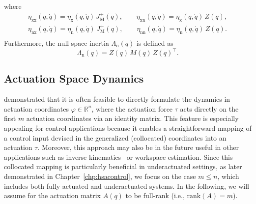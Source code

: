 where
\begin{equation}
\begin{split}
    \eta_\mathrm{xx}(q,\dot{q}) = \eta_\mathrm{x}(q,\dot{q}) \, J_\mathrm{M}^{+}(q),
    \qquad
    \eta_\mathrm{xn}(q,\dot{q}) = \eta_\mathrm{x}(q,\dot{q}) \, Z(q),\\
    \eta_\mathrm{nx}(q,\dot{q}) = \eta_\mathrm{n}(q,\dot{q}) \, J_\mathrm{M}^{+}(q),
    \qquad
    \eta_\mathrm{nn}(q,\dot{q}) = \eta_\mathrm{n}(q,\dot{q}) \, Z(q).\\
\end{split}
\end{equation}
Furthermore, the null space inertia $\Lambda_\mathrm{n}(q)$ is defined as~\citep{ott2008cartesian}
\begin{equation}
    \Lambda_\mathrm{n}(q) = Z(q) \, M(q) \, Z(q)^\top.
\end{equation}


\subsection{Actuation Space Dynamics}\label{sub:background:dynamics:actuation_space}
\citet{pustina2024input} demonstrated that it is often feasible to directly formulate the dynamics in actuation coordinates $\varphi \in \mathbb{R}^n$, where the actuation force $\tau$ acts directly on the first $m$ actuation coordinates via an identity matrix. This feature is especially appealing for control applications because it enables a straightforward mapping of a control input devised in the generalized (collocated) coordinates into an actuation $\tau$. Moreover, this approach may also be in the future useful in other applications such as inverse kinematics~\citep{della2025pushing} or workspace estimation. Since this collocated mapping is particularly beneficial in underactuated settings, as later demonstrated in Chapter~\ref{chp:hsacontrol}, we focus on the case $m \leq n$, which includes both fully actuated and underactuated systems.
In the following, we will assume for the actuation matrix $A(q)$ to be full-rank (i.e., $\mathrm{rank}(A) = m$).

